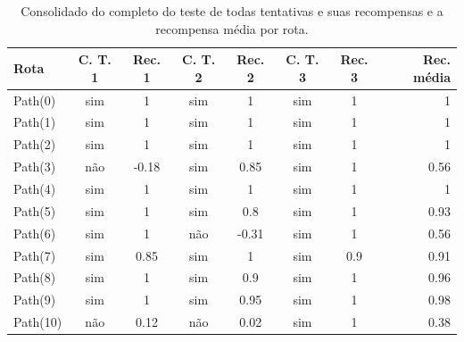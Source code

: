 \begin{table}[htpb]
    \centering
    \caption{Consolidado do completo do teste de todas tentativas e suas recompensas e a recompensa média por rota.}
    \label{resultado-tabela-geral}
    \begin{tabular}{|l|c|c|c|c|c|c|r|}
         \hline
         \small{Rota} & \small{C. T. 1} & \small{Rec. 1}  & \small{C. T. 2} &\small{Rec. 2} & \small{C. T. 3} &\small{Rec. 3} &\small{Rec. média}   \\ \hline
            Path(0)   &      sim        &   1             &    sim          &      1        &    sim          &      1     &      1                 \\ \hline
            Path(1)   &      sim        &   1             &    sim          &      1        &    sim          &      1     &      1                 \\ \hline
            Path(2)   &      sim        &   1             &    sim          &      1        &    sim          &      1     &      1                 \\ \hline
            Path(3)   &      não        &   -0.18         &    sim          &      0.85     &    sim          &      1     &      0.56              \\ \hline
            Path(4)   &      sim        &   1             &    sim          &      1        &    sim          &      1     &      1                 \\ \hline
            Path(5)   &      sim        &   1             &    sim          &      0.8      &    sim          &      1     &      0.93              \\ \hline
            Path(6)   &      sim        &   1             &    não          &      -0.31    &    sim          &      1     &      0.56              \\ \hline
            Path(7)   &      sim        &   0.85          &    sim          &      1        &    sim          &      0.9   &      0.91              \\ \hline
            Path(8)   &      sim        &   1             &    sim          &      0.9      &    sim          &      1     &      0.96              \\ \hline
            Path(9)   &      sim        &   1             &    sim          &      0.95     &    sim          &      1     &      0.98              \\ \hline
            Path(10)  &      não        &   0.12          &    não          &      0.02     &    sim          &      1     &      0.38              \\ \hline

\end{tabular}
\end{table}
